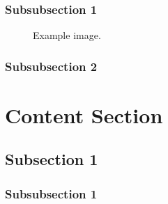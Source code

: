 \documentclass[12pt]{article} %
\begin{document}
\lipsum[2] %


\subsubsection{Subsubsection 1} %

\lipsum[3] %

\begin{figure}[H] %
\caption{Example image.}
\label{fig:speciation}
\end{figure}


\subsubsection{Subsubsection 2} %

\lipsum[4] %



\section{Content Section} %

\lipsum[5] %


\subsection{Subsection 1} %

\subsubsection{Subsubsection 1} %
\end{document}
